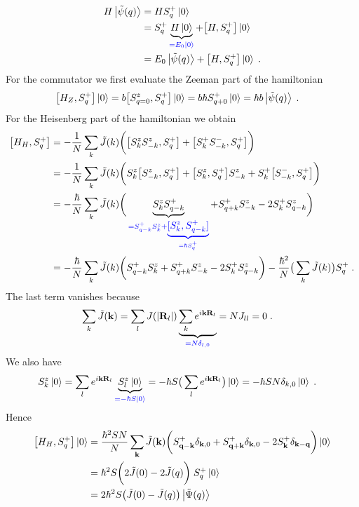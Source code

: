 %
\begin{align*}
H \ket{\tilde \psi(q)} &= H  S_{q}^{+} \ket{0} \\
&= S_{q}^{+} \underbrace{
H \ket{0}
}_{\color{blue} = E_{0}\ket{0}}+\big[H,  S_{q}^{+}\big] \ket{0}\\
&= E_{0} \ket{\tilde \psi(q)}  +\big[H,  S_{q}^{+}\big] \ket{0}\;.
\end{align*}
%
For the commutator we first evaluate the Zeeman part of the hamiltonian
%
\begin{align*}
\big[H_{Z},  S_{q}^{+}\big] \ket{0} &= b \big[S^{z}_{q=0},  S_{q}^{+}\big] \ket{0}= b \hbar S_{q+0}^{+}\ket{0} =
\hbar b \ket{\tilde \psi(q)}\;.
\end{align*}
%
For the Heisenberg part of the hamiltonian we obtain
%
\begin{align*}
\big[H_{H},  S_{q}^{+}\big]  &= -\frac{1}{N}\sum_{k} \tilde J(k)
\bigg(\big[S^{z}_{k}S^{z}_{-k},  S_{q}^{+}\big]
+
\big[S^{+}_{k}S^{-}_{-k},  S_{q}^{+}\big]\bigg)\\
&= -\frac{1}{N}\sum_{k} \tilde J(k)
\bigg(S^{z}_{k} \big[S^{z}_{-k},  S_{q}^{+}\big]
+
\big[S^{z}_{k},  S_{q}^{+}\big]S^{z}_{-k}
+
S^{+}_{k}\big[S^{-}_{-k},  S_{q}^{+}\big]\bigg)\\
&= -\frac{\hbar }{N}\sum_{k} \tilde J(k)
\bigg(\underbrace{
S^{z}_{k}  S_{q-k}^{+}
}_{\color{blue} = S_{q-k}^{+} S^{z}_{k}  + \underbrace{
[S^{z}_{k},  S_{q-k}^{+}]
}_{\color{blue} = \hbar S^{+}_{q}}}
+
 S_{q+k}^{+} S^{z}_{-k}
-2
S^{+}_{k}S^{z}_{q-k}\bigg)\\
&= -\frac{\hbar }{N}\sum_{k} \tilde J(k)
\bigg(
S_{q-k}^{+} S^{z}_{k}  
+
 S_{q+k}^{+} S^{z}_{-k}
-2
S^{+}_{k}S^{z}_{q-k}\bigg)
-\frac{\hbar^{2}}{N}\big(\sum_{k}\tilde J(k)\big) S^{+}_{q}\;.
\end{align*}
%
The last term vanishes because
%
\begin{align*}
\sum_{k}\tilde J(\mathbf k) &= \sum_{l} J(|\mathbf R_{l}|) \underbrace{
\sum_{k} e^{i \mathbf k\mathbf R_{l}}
}_{\color{blue} = N \delta_{l,0}} = N J_{ll} = 0\;.
\end{align*}
%
We also have
%
\begin{align*}
S^{z}_{k} \ket{0} &= \sum_{l} e^{i \mathbf k\mathbf R_{l}} \underbrace{
S_{l}^{z}\ket{0}
}_{\color{blue} = -\hbar S \ket{0}}
=-\hbar S\big( \sum_{l}e^{i \mathbf k\mathbf R_{l}}\big)\ket{0}
=-\hbar S N\delta_{k,0}\ket{0}\;.
\end{align*}
%
Hence
\begin{align*}
\big[H_{H},  S_{q}^{+}\big] \ket{0} 
&=  \frac{\hbar^{2} S N}{N} \sum_{\mathbf k} \tilde J(\mathbf k)
\bigg(
S_{\mathbf q-\mathbf k}^{+} \delta_{\mathbf k,0}
+
 S_{\mathbf q+\mathbf k}^{+} \delta_{\mathbf k,0}
-2
S^{+}_{\mathbf k}\delta_{\mathbf k-\mathbf q}\bigg)\ket{0}\\
&= \hbar^{2} S  \bigg(2 \tilde J(0)
-2 \tilde J(q)
\bigg)\;S^{+}_{q}\ket{0}\\
&= 2 \hbar^{2}  S \big( \tilde J(0)-\tilde J(q) \big) \ket{\tilde \Psi(q) }
\end{align*}
